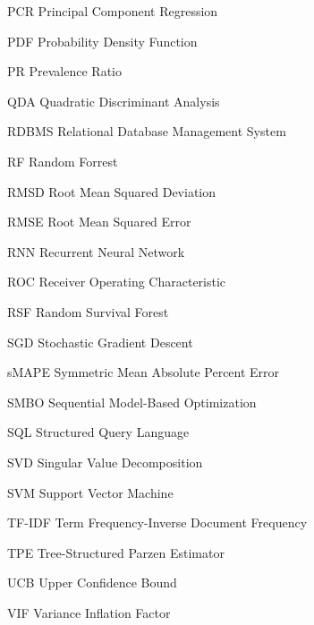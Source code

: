 \begin{symbollist}
  \item[PCR] Principal Component Regression
  \item[PDF] Probability Density Function
  \item[PR] Prevalence Ratio
  \item[QDA] Quadratic Discriminant Analysis
  \item[RDBMS] Relational Database Management System
  \item[RF] Random Forrest
  \item[RMSD] Root Mean Squared Deviation
  \item[RMSE] Root Mean Squared Error
  \item[RNN] Recurrent Neural Network
  \item[ROC] Receiver Operating Characteristic
  \item[RSF] Random Survival Forest
  \item[SGD] Stochastic Gradient Descent
  \item[sMAPE] Symmetric Mean Absolute Percent Error
  \item[SMBO] Sequential Model-Based Optimization
  \item[SQL] Structured Query Language
  \item[SVD] Singular Value Decomposition
  \item[SVM] Support Vector Machine
  \item[TF-IDF] Term Frequency-Inverse Document Frequency
  \item[TPE] Tree-Structured Parzen Estimator
  \item[UCB] Upper Confidence Bound
  \item[VIF] Variance Inflation Factor
\end{symbollist}
